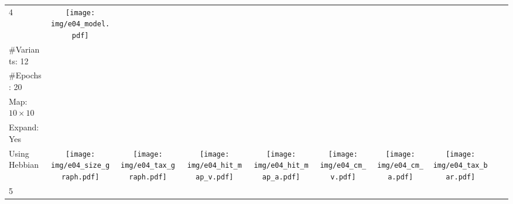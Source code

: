 \documentclass[twocolumn]{article}
\begin{document}
\begin{landscape}
\begin{table}
\begin{tabular}{lccccccccc}
\begin{minipage}{1.7cm}
            \end{minipage}
            \\
        \hline
        4
            & \begin{minipage}{1.7cm}
                \texttt{[image: img/e04\_model.pdf]}
            \end{minipage}
            & \begin{minipage}{2cm}
                \scriptsize
                \#Categories: 30 \\
                \#Variants: 12 \\
                \#Epochs: 20 \\
                Map: $10 \times 10$ \\
                Expand: Yes \\
                Using Hebbian
            \end{minipage}
            & \begin{minipage}{1.7cm}
                \texttt{[image: img/e04\_size\_graph.pdf]}
            \end{minipage}
            & \begin{minipage}{1.7cm}
                \texttt{[image: img/e04\_tax\_graph.pdf]}
            \end{minipage}
            & \begin{minipage}{1.7cm}
                \texttt{[image: img/e04\_hit\_map\_v.pdf]}
            \end{minipage}
            & \begin{minipage}{1.7cm}
                \texttt{[image: img/e04\_hit\_map\_a.pdf]}
            \end{minipage}
            & \begin{minipage}{1.7cm}
                \texttt{[image: img/e04\_cm\_v.pdf]}
            \end{minipage}
            & \begin{minipage}{1.7cm}
                \texttt{[image: img/e04\_cm\_a.pdf]}
            \end{minipage}
            & \begin{minipage}{1.7cm}
                \texttt{[image: img/e04\_tax\_bar.pdf]}
            \end{minipage}
            \\
        \hline
        5
            & \begin{minipage}{1.7cm}

\end{minipage}
\end{tabular}
\end{table}
\end{landscape}
\end{document}
